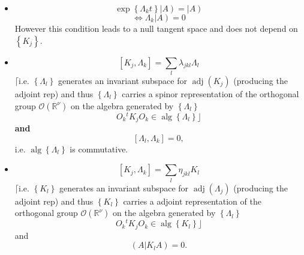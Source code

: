 \documentclass[aps,preprint]{revtex4}%
\begin{document}
\begin{itemize}
\item
\begin{equation}
\exp\left\{  \Lambda_{k}t\right\}  \left\vert A\right)  =\left\vert A\right)
\end{equation}%
\begin{equation}
\Leftrightarrow\Lambda_{k}\left\vert A\right)  =0
\end{equation}
However this condition leads to a null tangent space and does not depend on
$\left\{  K_{j}\right\}  .$

\item
\begin{equation}
\left[  K_{j},\Lambda_{k}\right]  =\sum_{l}\lambda_{jkl}\Lambda_{l}%
\end{equation}
$\lceil$i.e. $\left\{  \Lambda_{l}\right\}  $ generates an invariant subspace
for $\operatorname{adj}\left(  K_{j}\right)  $ (producing the adjoint rep) and
thus $\left\{  \Lambda_{l}\right\}  $ carries a spinor representation of the
orthogonal group $\mathcal{O}\left(  \mathbb{R}^{\nu}\right)  $ on the algebra
generated by $\left\{  \Lambda_{l}\right\}  $
\begin{equation}
O_{k}{}^{t}K_{j}O_{k}\in\operatorname{alg}\left\{  \Lambda_{l}\right\}
\rfloor
\end{equation}
\textbf{and}%
\begin{equation}
\left[  \Lambda_{l},\Lambda_{k}\right]  =0,
\end{equation}
i.e. $\operatorname{alg}\left\{  \Lambda_{l}\right\}  $ is commutative.

\item
\begin{equation}
\left[  K_{j},\Lambda_{k}\right]  =\sum_{l}\eta_{jkl}K_{l}%
\end{equation}
$\lceil$i.e. $\left\{  K_{l}\right\}  $ generates an invariant subspace for
$\operatorname{adj}\left(  \Lambda_{j}\right)  $ (producing the adjoint rep)
and thus $\left\{  K_{l}\right\}  $ carries a adjoint representation of the
orthogonal group $\mathcal{O}\left(  \mathbb{R}^{\nu}\right)  $ on the algebra
generated by $\left\{  \Lambda_{l}\right\}  $
\begin{equation}
O_{k}{}^{t}K_{j}O_{k}\in\operatorname{alg}\left\{  K_{l}\right\}  \rfloor
\end{equation}
and
\begin{equation}
\left(  A\left\vert K_{l}A\right.  \right)  =0.
\end{equation}



\end{itemize}
\end{document}
